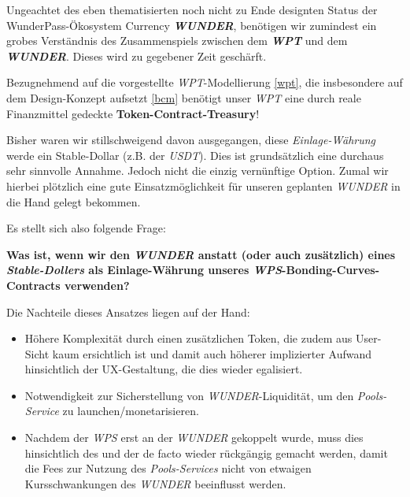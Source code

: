 \vspace{0.3cm}

Ungeachtet des eben thematisierten noch nicht zu Ende designten Status der Wunder\-Pass-Ökosystem Currency \textbf{\textit{WUNDER}}, benötigen wir zumindest ein grobes Verständnis des Zusammenspiels zwischen dem \textbf{\textit{WPT}} und dem \textbf{\textit{WUNDER}}. Dieses wird zu gegebener Zeit geschärft.

\vspace{0.3cm}

\begin{Konzept}
\label{doller-vs-wunder}
\vspace{0.2cm}

Bezugnehmend auf die vorgestellte \textit{WPT}-Modellierung \ref{wpt}, die insbesondere auf dem Design-Konzept aufsetzt \ref{bcm} benötigt unser \textit{WPT} eine durch reale Finanzmittel gedeck\-te \textbf{Token-Contract-Treasury}!

\vspace{0.2cm}

Bisher waren wir stillschweigend davon ausgegangen, diese \textit{Einlage-Währung} werde ein Stable-Dollar (z.B. der \textit{USDT}). Dies ist grundsätzlich eine durchaus sehr sinn\-volle Annahme. Jedoch nicht die einzig vernünftige Option. Zumal wir hierbei plötzlich eine gute Einsatzmöglichkeit für unseren geplanten \textit{WUNDER} in die Hand gelegt bekommen.

\vspace{0.2cm}

Es stellt sich also folgende Frage:

\noindent\hrulefill

\textbf{Was ist, wenn wir den \textit{WUNDER} anstatt (oder auch zusätzlich) eines \textit{Stable-Dollers} als Einlage-Währung unseres \textit{WPS}-Bonding-Curves-Con\-tracts verwenden?}

\noindent\hrulefill

\vspace{0.2cm}

Die Nachteile dieses Ansatzes liegen auf der Hand:

\begin{itemize}
	\item Höhere Komplexität durch einen zusätzlichen Token, die zudem aus User-Sicht kaum ersichtlich ist und damit auch höherer implizierter Aufwand hinsichtlich der UX-Gestaltung, die dies wieder egalisiert. 
	\item Notwendigkeit zur Sicherstellung von \textit{WUNDER}-Liquidität, um den \textit{Pools-Service} zu launchen/monetarisieren.
	\item Nachdem der \textit{WPS} erst an der \textit{WUNDER} gekoppelt wurde, muss dies hinsichtlich des  und der  de facto wieder rückgängig gemacht werden, damit die Fees zur Nutzung des \textit{Pools-Services} nicht von etwaigen Kursschwankungen des \textit{WUNDER} beeinflusst werden.
	

\end{itemize}
\end{Konzept}
